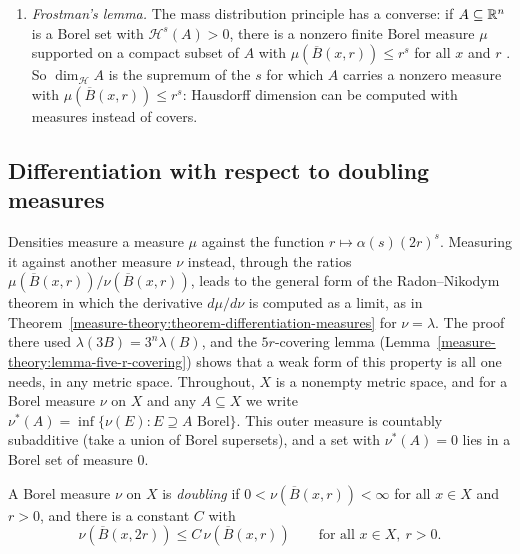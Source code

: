\begin{remark}
\begin{enumerate}
$x$ \cite{preiss-1987}, and \emph{Marstrand's theorem} says that if $0 < \Theta^s(\mu, x) < \infty$ on a set of positive $\mu$-measure, then $s$ is an integer \cite{mattila-1995}. Preiss's proof
studies the \emph{tangent measures} of $\mu$ at $x$, the weak limits (Section~\ref{measure-theory:section-weak-convergence}) of the rescaled measures $A \mapsto \mu(x + rA)/r^k$ as $r \to 0$; existence
of the density forces them to be flat.
\item \emph{Frostman's lemma.} The mass distribution principle has a converse: if $A \subseteq \mathbb{R}^n$ is a Borel set with $\mathcal{H}^s(A) > 0$, there is a nonzero finite Borel measure $\mu$ supported on a
compact subset of $A$ with $\mu(\overline{B}(x, r)) \leq r^s$ for all $x$ and $r$ \cite{mattila-1995}. So $\dim_{\mathcal{H}}A$ is the supremum of the $s$ for which $A$ carries a nonzero measure with
$\mu(\overline{B}(x, r)) \leq r^s$: Hausdorff dimension can be computed with measures instead of covers.
\end{enumerate}
\end{remark}

\subsection{Differentiation with respect to doubling measures}\label{measure-theory:subsection-doubling}

Densities measure a measure $\mu$ against the function $r \mapsto \alpha(s)(2r)^s$. Measuring it against another measure $\nu$ instead, through the ratios $\mu(\overline{B}(x, r))/\nu(\overline{B}(x, r))$,
leads to the general form of the Radon--Nikodym theorem in which the derivative $d\mu/d\nu$ is computed as a limit, as in Theorem~\ref{measure-theory:theorem-differentiation-measures} for
$\nu = \lambda$. The proof there used $\lambda(3B) = 3^n\lambda(B)$, and the $5r$-covering lemma (Lemma~\ref{measure-theory:lemma-five-r-covering}) shows that a weak form of this property is all one
needs, in any metric space. Throughout, $X$ is a nonempty metric space, and for a Borel measure $\nu$ on $X$ and any $A \subseteq X$ we write $\nu^*(A) = \inf\{\nu(E) : E \supseteq A \text{ Borel}\}$.
This outer measure is countably subadditive (take a union of Borel supersets), and a set with $\nu^*(A) = 0$ lies in a Borel set of measure $0$.

\begin{definition}\label{measure-theory:definition-doubling}
A Borel measure $\nu$ on $X$ is \emph{doubling} if $0 < \nu(\overline{B}(x, r)) < \infty$ for all $x \in X$ and $r > 0$, and there is a constant $C$ with
\[
\nu(\overline{B}(x, 2r)) \leq C\,\nu(\overline{B}(x, r)) \qquad \text{for all } x \in X,\ r > 0 .
\]
\end{definition}

